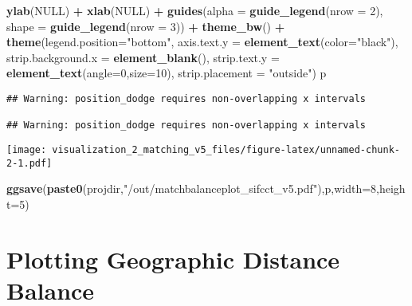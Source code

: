 \documentclass[
]{article}
\newenvironment{Shaded}{\begin{snugshade}}{\end{snugshade}}
\newcommand{\DataTypeTok}[1]{\textcolor[rgb]{0.13,0.29,0.53}{#1}}
\newcommand{\DecValTok}[1]{\textcolor[rgb]{0.00,0.00,0.81}{#1}}
\newcommand{\KeywordTok}[1]{\textcolor[rgb]{0.13,0.29,0.53}{\textbf{#1}}}
\newcommand{\NormalTok}[1]{#1}
\newcommand{\OperatorTok}[1]{\textcolor[rgb]{0.81,0.36,0.00}{\textbf{#1}}}
\newcommand{\OtherTok}[1]{\textcolor[rgb]{0.56,0.35,0.01}{#1}}
\newcommand{\StringTok}[1]{\textcolor[rgb]{0.31,0.60,0.02}{#1}}
\begin{document}
\begin{Shaded}
\begin{Highlighting}[]
\StringTok{  }\KeywordTok{ylab}\NormalTok{(}\OtherTok{NULL}\NormalTok{) }\OperatorTok{+}\StringTok{ }\KeywordTok{xlab}\NormalTok{(}\OtherTok{NULL}\NormalTok{) }\OperatorTok{+}\StringTok{ }
\StringTok{  }\KeywordTok{guides}\NormalTok{(}\DataTypeTok{alpha =} \KeywordTok{guide_legend}\NormalTok{(}\DataTypeTok{nrow =} \DecValTok{2}\NormalTok{), }
         \DataTypeTok{shape =} \KeywordTok{guide_legend}\NormalTok{(}\DataTypeTok{nrow =} \DecValTok{3}\NormalTok{)) }\OperatorTok{+}\StringTok{ }
\StringTok{  }\KeywordTok{theme_bw}\NormalTok{() }\OperatorTok{+}\StringTok{  }
\StringTok{  }\KeywordTok{theme}\NormalTok{(}\DataTypeTok{legend.position=}\StringTok{"bottom"}\NormalTok{,}
        \DataTypeTok{axis.text.y =} \KeywordTok{element_text}\NormalTok{(}\DataTypeTok{color=}\StringTok{"black"}\NormalTok{),}
        \DataTypeTok{strip.background.x =} \KeywordTok{element_blank}\NormalTok{(),}
        \DataTypeTok{strip.text.y =} \KeywordTok{element_text}\NormalTok{(}\DataTypeTok{angle=}\DecValTok{0}\NormalTok{,}\DataTypeTok{size=}\DecValTok{10}\NormalTok{),}
        \DataTypeTok{strip.placement =} \StringTok{"outside"}\NormalTok{)}
\NormalTok{p}
\end{Highlighting}
\end{Shaded}

\begin{verbatim}
## Warning: position_dodge requires non-overlapping x intervals

## Warning: position_dodge requires non-overlapping x intervals
\end{verbatim}

\texttt{[image: visualization\_2\_matching\_v5\_files/figure-latex/unnamed-chunk-2-1.pdf]}

\begin{Shaded}
\begin{Highlighting}[]
\KeywordTok{ggsave}\NormalTok{(}\KeywordTok{paste0}\NormalTok{(projdir,}\StringTok{"/out/matchbalanceplot_sifcct_v5.pdf"}\NormalTok{),p,}\DataTypeTok{width=}\DecValTok{8}\NormalTok{,}\DataTypeTok{height=}\DecValTok{5}\NormalTok{)}
\end{Highlighting}
\end{Shaded}

\hypertarget{plotting-geographic-distance-balance}{%
\section{Plotting Geographic Distance
Balance}\label{plotting-geographic-distance-balance}}
\end{document}
